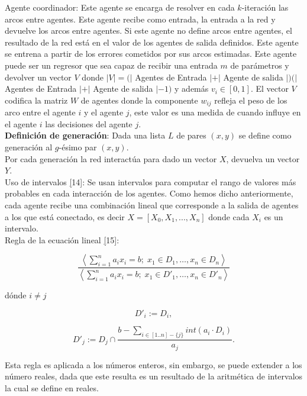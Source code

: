 \documentclass{article}
\begin{document}
        Agente coordinador: Este agente se encarga de resolver en cada $k$-iteración las arcos entre agentes. Este agente recibe como entrada, la entrada a la red 
        y devuelve los arcos entre agentes. Si este agente no define arcos entre agentes, el resultado de la red está en el valor de los agentes de salida definidos. Este agente se entrena 
        a partir de los errores cometidos por sus arcos estimadas. Este agente puede ser un regresor que sea capaz de recibir una entrada $m$ de parámetros y devolver
         un vector $V$ donde $|V|=(|$ Agentes de Entrada $| + |$ Agente de salida $|)(|$ Agentes de Entrada $| + |$ Agente de salida $| - 1)$ y además $v_i \in [0,1]$.
          El vector $V$ codifica la matriz $W$ de agentes donde la componente $w_{ij}$ refleja el peso de los arco entre el agente $i$ y el agente $j$, este valor es una 
          medida de cuando influye en el agente $i$ las decisiones del agente $j$.\\

        \textbf{Definición de generación}: Dada una lista $L$ de pares $(x,y)$ se define como generación al $g$-ésimo par $(x,y)$. \\

        Por cada generación la red interactúa para dado un vector $X$, devuelva un vector $Y$.\\

        Uso de intervalos \hyperref[sec:24][14]: Se usan intervalos para computar el rango de valores más probables en cada interacción de los agentes. Como hemos dicho anteriormente, cada agente recibe una combinación lineal
        que corresponde a la salida de agentes a los que está conectado, es decir $X=[X_0,X_1,...,X_n]$ donde cada $X_i$ es un intervalo. \\

        Regla de la ecuación lineal \hyperref[sec:25][15]:

                $$\frac{\left\langle \sum_{i=1}^{n} a_i x_i = b ; \; x_1 \in D_1, \ldots, x_n \in D_n \right\rangle}
                {\left\langle \sum_{i=1}^{n} a_i x_i = b ; \; x_1 \in D'_1, \ldots, x_n \in D'_n \right\rangle}$$

            dónde $i \neq j$

            \[ D'_i := D_i, \]

            \[ D'_j := D_j \cap \frac{b - \sum_{i \in [1..n] - \{j\}} int(a_i \cdot D_i)}{a_j}. \]

            Esta regla es aplicada a los números enteros, sin embargo, se puede extender a los número reales, dada que este resulta es un resultado de la aritmética de intervalos la cual se define en reales.\\
\end{document}

